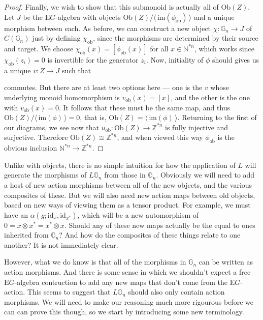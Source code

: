 \documentclass{amsart} %
\newenvironment{eq*}{\begin{equation*}}{\end{equation*}}
\begin{document}
\begin{proof}
Finally, we wish to show that this submonoid is actually all of  $\mathrm{Ob}(Z)$. Let $J$ be the $\mathrm{E}G$-algebra with objects $\mathrm{Ob}(Z) / \langle \, \mathrm{im}(\phi_{\mathrm{ob}}) \, \rangle$ and a unique morphism between each. As before, we can construct a new object $\chi : \mathbb{G}_n \to J$ of $C(\mathbb{G}_n)$ just by defining $\chi_{\mathrm{ob}}$, since the morphisms are determined by their source and target. We choose $\chi_{\mathrm{ob}}(x) = [\phi_{\mathrm{ob}}(x)]$ for all $x \in \mathbb{N}^{*n}$, which works since $\chi_{\mathrm{ob}}(z_i) = 0$ is invertible for the generator $z_i$. Now, initiality of $\phi$ should gives us a unique $v : Z \to J$ such that 
\begin{eq*} 
\end{eq*}
commutes. But there are at least two options here --- one is the $v$ whose underlying monoid homomorphism is $v_{\mathrm{ob}}(x) = [x]$, and the other is the one with $v_{\mathrm{ob}}(x) = 0$. It follows that these must be the same map, and thus $ \mathrm{Ob}(Z) /  \langle \, \mathrm{im}(\phi) \, \rangle = 0$, that is, $\mathrm{Ob}(Z) =  \langle \, \mathrm{im}(\phi) \, \rangle$. Returning to the first of our diagrams, we see now that $u_{\mathrm{ob}} : \mathrm{Ob}(Z) \to \mathbb{Z}^{*n}$ is fully injective and surjective. Therefore $ \mathrm{Ob}(Z) \cong \mathbb{Z}^{*n}$, and when viewed this way $\phi_{\mathrm{ob}}$ is the obvious inclusion $\mathbb{N}^{*n} \to \mathbb{Z}^{*n}$.
\end{proof}

Unlike with objects, there is no simple intuition for how the application of $L$ will generate the morphisms of $L\mathbb{G}_n$ from those in $\mathbb{G}_n$. Obviously we will need to add a host of new action morphisms between all of the new objects, and the various composites of these. But we will also need new action maps between old objects, based on new ways of viewing them as a tensor product. For example, we must have an $\alpha(g; \mathrm{id}_x, \mathrm{id}_{x^*})$, which will be a new automorphism of $0 = x \otimes x^* = x^* \otimes x$. Should any of these new maps actually be the equal to ones inherited from $\mathbb{G}_n$? And how do the composites of these things relate to one another? It is not immediately clear. 

However, what we do know is that all of the morphisms in $\mathbb{G}_n$ can be written as action morphisms. And there is some sense in which we shouldn't expect a free $\mathrm{E}G$-algebra contruction to add any new maps that don't come from the $\mathrm{E}G$-action. This seems to suggest that $L\mathbb{G}_n$ should also only contain action morphisms. We will need to make our reasoning much more rigourous before we can can prove this though, so we start by introducing some new terminology.
\end{document}
